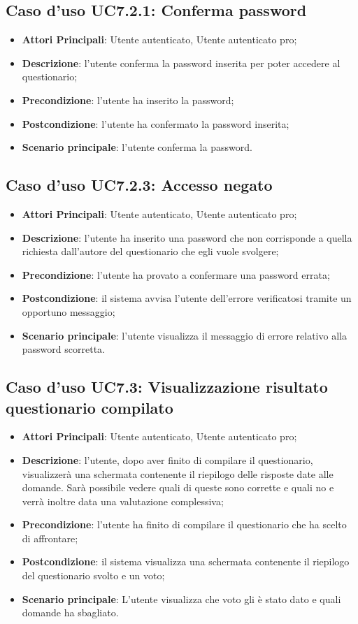 \subsection{Caso d'uso UC7.2.1: Conferma password}
\begin{itemize}
\item\textbf{Attori Principali}: Utente autenticato, Utente autenticato pro;
\item\textbf{Descrizione}: l'utente conferma la password inserita per poter accedere al questionario;
\item\textbf{Precondizione}: l'utente ha inserito la password;
\item\textbf{Postcondizione}: l'utente ha confermato la password inserita;
\item\textbf{Scenario principale}: l'utente conferma la password.
\end{itemize}

\subsection{Caso d'uso UC7.2.3: Accesso negato}
\begin{itemize}
\item\textbf{Attori Principali}: Utente autenticato, Utente autenticato pro;
\item\textbf{Descrizione}: l'utente ha inserito una password che non corrisponde a quella richiesta dall'autore del questionario che egli vuole svolgere;
\item\textbf{Precondizione}: l'utente ha provato a confermare una password errata;
\item\textbf{Postcondizione}: il sistema avvisa l'utente dell'errore verificatosi tramite un opportuno messaggio;
\item\textbf{Scenario principale}: l'utente visualizza il messaggio di errore relativo alla password scorretta.
\end{itemize}

\subsection{Caso d'uso UC7.3: Visualizzazione risultato questionario compilato}
\begin{itemize}
\item\textbf{Attori Principali}: Utente autenticato, Utente autenticato pro;
\item\textbf{Descrizione}: l'utente, dopo aver finito di compilare il questionario, visualizzerà una schermata contenente il riepilogo delle risposte date alle domande. Sarà possibile vedere quali di queste sono corrette e quali no e verrà inoltre data una valutazione complessiva;
\item\textbf{Precondizione}: l'utente ha finito di compilare il questionario che ha scelto di affrontare;
\item\textbf{Postcondizione}: il sistema visualizza una schermata contenente il riepilogo del questionario svolto e un voto;
\item\textbf{Scenario principale}: L'utente visualizza che voto gli è stato dato e quali domande ha sbagliato.
\end{itemize}

